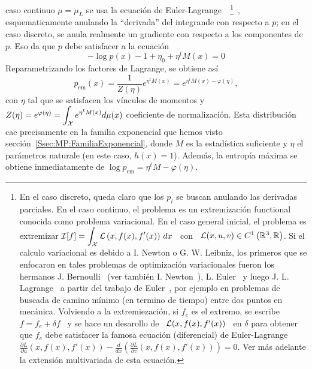 caso continuo $\mu = \mu_L$ se usa la ecuaci\'on de Euler-Lagrange~ \footnote{En
el caso  discreto, queda claro  que los $p_i$  se buscan anulando  las derivadas
parciales. En  el caso  continuo, el problema  es un  extremizaci\'on functional
conocida como problema variacional.  En el  caso general inicial, el problema es
extremizar $\displaystyle \mathcal{I}[f]  = \int_{\mathcal{X}} \mathcal{L}\left( x , f(x)  , f'(x) \right) \,
dx$ \ con  \ $\mathcal{L}(x,u,v) \in C^1\left(  \mathbb{R}^3 , \mathbb{R} \right)$.   Si el calculo
variacional  es debido  a I.   Newton o  G.  W.   Leibniz, los  primeros que  se
enfocaron en tales problemas de optimizaci\'on variacionales fueron los hermanos
J.      Bernoulli~\cite{Ber1697,     Ber1701,    Ber1718}     (ver     tambi\'en
I. Newton~\cite{New1696}),  L.  Euler~\cite{Eul1738,  Eul1744, Eul1766}  y luego
J. L.   Lagrange~\cite{Lag1760:1, Lag1760:2,  Lag1766} a  partir del  trabajo de
Euler~\cite{Gol80, Fra92, Fra94, BraSan07}, por  ejemplo en problemas de buscada
de   camino   m\'inimo   (en   termino   de  tiempo)   entre   dos   puntos   en
mec\'anica.  Volviendo  a  la  extremiezaci\'on,  si $f_e$  es  el  extremo,  se
escribe  \   $f  =  f_e   +  \delta  f$   \  y  se   hace  un  desarollo   de  \
$\mathcal{L}(x,f(x),f'(x))$  \ en  $\delta$ para  obtener  que $f_e$  debe satisfacer  la
famosa       ecuaci\'on       (diferencial)      de       Euler-Lagrange       \
$\displaystyle        \frac{\partial         L}{\partial        u}(x,f(x),f'(x))
- \frac{d}{dx}  \left(  \frac{\partial  L}{\partial v}(x,f(x),f'(x))  \right)  =
0$.    Ver    m\'as   adelante    la    extensi\'on    multivariada   de    esta
ecuaci\'on.\label{Foot:SZ:EulerLagrange}}~\cite{GelFom63,  Wei74, Bru04,  Cla13,
Kom14}, esquematicamente anulando la ``derivada''  del integrande con respecto a
$p$; en  el caso discreto,  se anula realmente un  gradiente con respecto  a los
componentes de $p$. Eso da que $p$ debe satisfacer a la ecuaci\'on
%
\[
- \log p(x) - 1 + \eta_0 + \eta^t M(x) = 0
\]
%
Reparametrizando los factores de Lagrange, se obtiene as\'i
%
\[
p_{\mathrm{em}}(x) = \frac{1}{Z(\eta)} e^{\eta^t M(x)} = e^{\eta^t M(x) - \varphi(\eta)},
\]
%
con $\eta$  tal que  se satisfacen  los v\'inculos  de momentos  y \  $Z(\eta) =
e^{\varphi(\eta)} =  \displaystyle \int_{\mathcal{X}} e^{\eta^t M(x)}  d\mu(x)$ coeficiente
de  normalizaci\'on.   Esta  distribuci\'on   cae  precisamente  en  la  familia
exponencial  que hemos  visto secci\'on~\ref{Ssec:MP:FamiliaExponencial},  donde
$M$ es  la estad\'istica suficiente y  $\eta$ el par\'ametros naturale  (en este
caso, $h(x) = 1$). Adem\'as, la entrop\'ia m\'axima se obtiene inmediatamente de
$\log p_{\mathrm{em}} = \eta^t M - \varphi(\eta)$.
%


